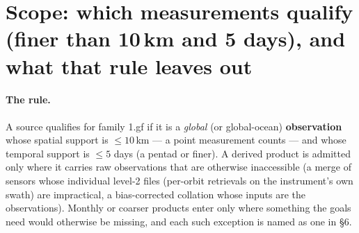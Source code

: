 \documentclass[10pt]{article}
\begin{document}
\begin{abstract}
things the research settled change the design: no ocean-wind, sea-surface
salinity or microwave-SST (sea-surface temperature from microwave radiometers, which see through cloud) product exists at ten kilometres, so wind is an
\emph{exception} to decide and the other two are out; the daily 4\,km and
5\,km fields are 10--30\,\% valid and 0.2--1.5\,TB each even compressed, so
the gridded tier gains a sharded, tiled, compressed layout for grids finer
than $0.25^\circ$; and several sources have ended or changed recently (Pathfinder SST, NOAA's 4\,km infrared record,
stopped at 2023, IMERG --- NASA's merged satellite precipitation --- in its V07 Final run at 2025-09, and the sea-ice line of NSIDC (the US National Snow and Ice Data Center) from AMSR2 (a Japanese microwave radiometer) at 2025-08),
so the family is built from the successors. The note gives the ledger, the
storage design, the per-store row and byte arithmetic, a three-phase build
ladder (phase A $\approx 0.5$\,TB, eight stores, keyless or hosted-runner
credentials only --- hosted runners are GitHub's own build machines), the falsifier (the test that can show a store is not worth keeping) that decides whether each store earned its
place, and the decisions left to Chris.
\end{abstract}

\section{Scope: which measurements qualify (finer than 10\,km and 5 days), and what that rule leaves out}

\paragraph{The rule.} A source qualifies for family 1.gf if it is a
\emph{global} (or global-ocean) \textbf{observation} whose spatial support is
$\le 10$\,km --- a point measurement counts --- and whose temporal support is
$\le 5$ days (a pentad or finer). A derived product is admitted only where it
carries raw observations that are otherwise inaccessible (a merge of sensors
whose individual level-2 files (per-orbit retrievals on the instrument's own swath) are impractical, a bias-corrected collation
whose inputs are the observations). Monthly or coarser products enter only
where something the goals need would otherwise be missing, and each such
exception is named as one in \S6.
\end{document}
